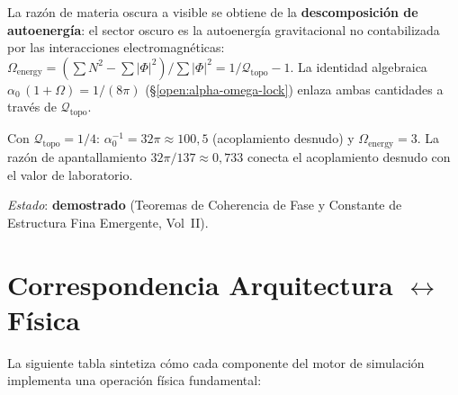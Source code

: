 \documentclass[11pt, a4paper, openany]{book}
\begin{document}
La raz\'on de materia oscura a visible se obtiene de la
\textbf{descomposici\'on de autoenerg\'ia}: el sector oscuro es la
autoenerg\'ia gravitacional no contabilizada por las interacciones
electromagn\'eticas:
$\Omega_{\mathrm{energy}} = (\sum N^2 - \sum|\Phi|^2) / \sum|\Phi|^2
= 1/\mathcal{Q}_{\mathrm{topo}} - 1$.
La identidad algebraica $\alpha_0\,(1 + \Omega) = 1/(8\pi)$
(\S\ref{open:alpha-omega-lock}) enlaza ambas cantidades a trav\'es de
$\mathcal{Q}_{\mathrm{topo}}$.

Con $\mathcal{Q}_{\mathrm{topo}} = 1/4$:
$\alpha_0^{-1} = 32\pi \approx 100{,}5$ (acoplamiento desnudo) y
$\Omega_{\mathrm{energy}} = 3$.
La raz\'on de apantallamiento $32\pi/137 \approx 0{,}733$ conecta
el acoplamiento desnudo con el valor de laboratorio.

\medskip\noindent
\textit{Estado}: \textbf{demostrado} (Teoremas de Coherencia de Fase
y Constante de Estructura Fina Emergente, Vol~II).

\section{Correspondencia Arquitectura $\leftrightarrow$ F\'isica}

\noindent
La siguiente tabla sintetiza c\'omo cada componente del motor de
simulaci\'on implementa una operaci\'on f\'isica fundamental:
\end{document}

